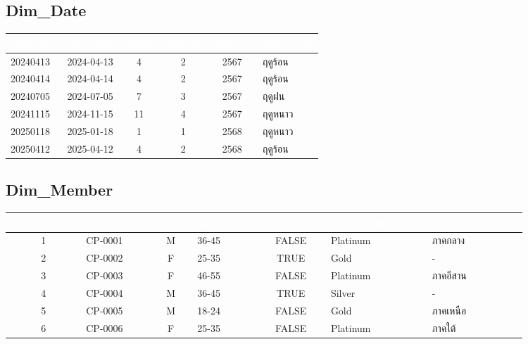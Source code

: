 \documentclass[11pt]{article}
\begin{document}
\subsection*{Dim_Date}
\begin{adjustbox}{max width=\linewidth}
\begin{tabular}{@{}l l c c c l@{}}
\toprule
\rowcolor{tblHead}\textcolor{white}{date_key} & \textcolor{white}{full_date} & \textcolor{white}{month} & \textcolor{white}{quarter} & \textcolor{white}{year_be} & \textcolor{white}{season_th}\\
\midrule
20240413 & 2024-04-13 & 4 & 2 & 2567 & ฤดูร้อน\\
20240414 & 2024-04-14 & 4 & 2 & 2567 & ฤดูร้อน\\
20240705 & 2024-07-05 & 7 & 3 & 2567 & ฤดูฝน\\
20241115 & 2024-11-15 & 11 & 4 & 2567 & ฤดูหนาว\\
20250118 & 2025-01-18 & 1 & 1 & 2568 & ฤดูหนาว\\
20250412 & 2025-04-12 & 4 & 2 & 2568 & ฤดูร้อน\\
\bottomrule
\end{tabular}
\end{adjustbox}

\subsection*{Dim_Member}
\begin{adjustbox}{max width=\linewidth}
\begin{tabular}{@{}c l c l c l l@{}}
\toprule
\rowcolor{tblHead}\textcolor{white}{member_key} & \textcolor{white}{member_id} & \textcolor{white}{gender} & \textcolor{white}{age_group} & \textcolor{white}{is_foreigner} & \textcolor{white}{membership_level} & \textcolor{white}{home_region_th}\\
\midrule
1 & CP-0001 & M & 36-45 & FALSE & Platinum & ภาคกลาง\\
2 & CP-0002 & F & 25-35 & TRUE & Gold & -\\
3 & CP-0003 & F & 46-55 & FALSE & Platinum & ภาคอีสาน\\
4 & CP-0004 & M & 36-45 & TRUE & Silver & -\\
5 & CP-0005 & M & 18-24 & FALSE & Gold & ภาคเหนือ\\
6 & CP-0006 & F & 25-35 & FALSE & Platinum & ภาคใต้\\
\bottomrule
\end{tabular}
\end{adjustbox}
\end{document}
